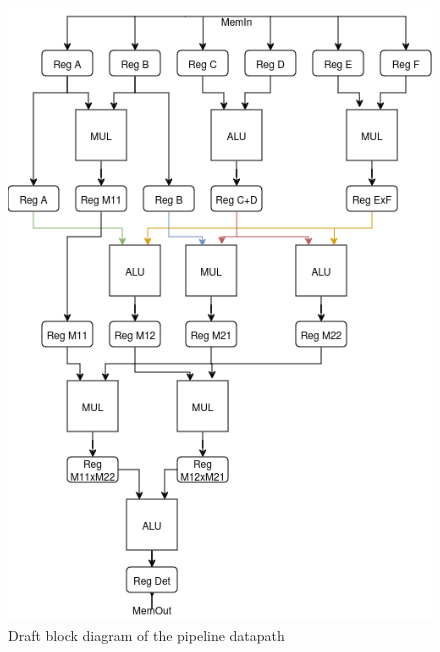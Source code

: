 \documentclass[12pt]{article}
\begin{document}
\begin{figure}[H]
	\centering
	\includegraphics[width=0.7\linewidth]{images/pipe.png}
	\caption{Draft block diagram of the pipeline datapath}
	\label{fig:pipe}
\end{figure}
\end{document}
